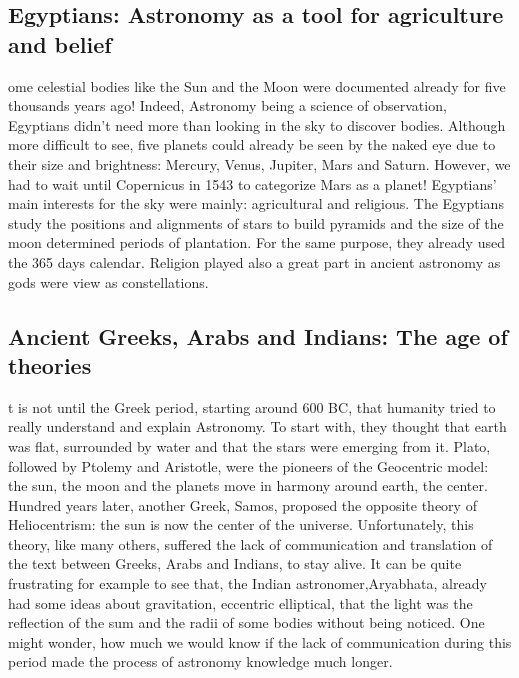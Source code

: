 \subsection*{Egyptians: Astronomy as a tool for agriculture and belief}
ome celestial bodies like the Sun and the Moon were documented already for five thousands years ago! Indeed, Astronomy being a science of observation, Egyptians didn't need more than looking in the sky to discover bodies. Although more difficult to see, five planets could already be seen by the naked eye due to their size and brightness: Mercury, Venus, Jupiter, Mars and Saturn. However, we had to wait until Copernicus in 1543 to categorize Mars as a planet! Egyptians' main interests for the sky were mainly: agricultural and religious. The Egyptians study the positions and alignments of stars to build pyramids and the size of the moon determined periods of plantation. For the same purpose, they already used the 365 days calendar. Religion played also a great part in ancient astronomy as gods were view as constellations.

\subsection*{Ancient Greeks, Arabs and Indians: The age of theories}
t is not until the Greek period, starting around 600 BC, that humanity tried to really understand and explain Astronomy. To start with, they thought that earth was flat, surrounded by water and that the stars were emerging from it. Plato, followed by Ptolemy and Aristotle, were the pioneers of the Geocentric model: the sun, the moon and the planets move in harmony around earth, the center. Hundred years later, another Greek, Samos, proposed the opposite theory of Heliocentrism: the sun is now the center of the universe. Unfortunately, this theory, like many others, suffered the lack of communication and translation of the text between Greeks, Arabs and Indians, to stay alive. It can be quite frustrating for example to see that, the Indian astronomer,Aryabhata, already had some ideas about gravitation, eccentric elliptical, that the light was the reflection of the sum and the radii of some bodies without being noticed. One might wonder, how much we would know if the lack of communication during this period made the process of astronomy knowledge much longer.

